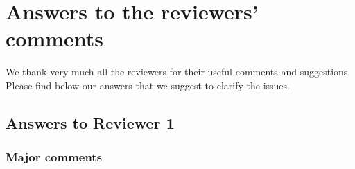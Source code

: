 \documentclass{article}%
\begin{document}
\section*{Answers to the reviewers' comments 
}


We thank very much all the reviewers for their useful comments and suggestions.
Please find below our answers that we suggest to clarify the issues.


\subsection*{Answers to Reviewer 1}

\subsubsection*{Major comments}
\end{document}
